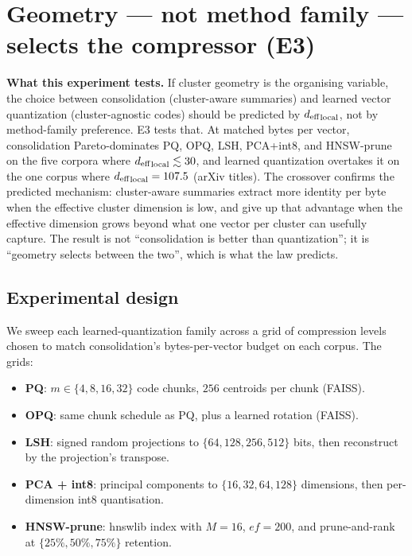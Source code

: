 \section{Geometry --- not method family --- selects the compressor (E3)}
\label{sec:e3}

\begin{intuition}
\textbf{What this experiment tests.} If cluster geometry is the
organising variable, the choice between consolidation (cluster-aware
summaries) and learned vector quantization (cluster-agnostic codes)
should be predicted by ${d_{\mathrm{eff}}}_{\mathrm{local}}$, not by method-family
preference. E3 tests that. At matched bytes per vector, consolidation
Pareto-dominates PQ, OPQ, LSH, PCA+int8, and HNSW-prune on the five
corpora where ${d_{\mathrm{eff}}}_{\mathrm{local}} \lesssim 30$, and
learned quantization overtakes it on the one corpus where
${d_{\mathrm{eff}}}_{\mathrm{local}} = 107.5$ (arXiv titles). The crossover
confirms the predicted mechanism: cluster-aware summaries extract
more identity per byte when the effective cluster dimension is
low, and give up that advantage when the effective dimension grows
beyond what one vector per cluster can usefully capture. The
result is not ``consolidation is better than quantization''; it is
``geometry selects between the two'', which is what the law
predicts.
\end{intuition}

\subsection{Experimental design}
\label{sec:e3:design}

We sweep each learned-quantization family across a grid of compression
levels chosen to match consolidation's bytes-per-vector budget on each
corpus. The grids:

\begin{itemize}[leftmargin=1.8em, itemsep=2pt]
\item \textbf{PQ}: $m \in \{4, 8, 16, 32\}$ code chunks, $256$
centroids per chunk (FAISS).
\item \textbf{OPQ}: same chunk schedule as PQ, plus a learned
rotation (FAISS).
\item \textbf{LSH}: signed random projections to
$\{64, 128, 256, 512\}$ bits, then reconstruct by the projection's
transpose.
\item \textbf{PCA + int8}: principal components to
$\{16, 32, 64, 128\}$ dimensions, then per-dimension int8 quantisation.
\item \textbf{HNSW-prune}: hnswlib index with $M = 16$, $ef = 200$,
and prune-and-rank at $\{25\%, 50\%, 75\%\}$ retention.
\end{itemize}

